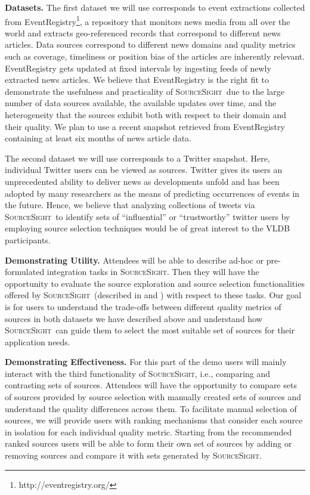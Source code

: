 \documentclass{vldb}
\newcommand\system{\textsc{SourceSight}}
\begin{document}
\vspace{2pt}\noindent\textbf{Datasets.} The first dataset we will use corresponds to event extractions collected from EventRegistry\footnote{http://eventregistry.org/}, a repository that monitors news media from all over the world and extracts geo-referenced records that correspond to different news articles. Data sources correspond to different news domains and quality metrics such as coverage, timeliness or position bias of the articles are inherently relevant. EventRegistry gets updated at fixed intervals  by ingesting feeds of newly extracted news articles. We believe that EventRegistry is the right fit to demonstrate the usefulness and practicality of \system~due to the large number of data sources available, the available updates over time, and the heterogeneity that the sources exhibit both with respect to their domain and their quality. We plan to use a recent snapshot retrieved from EventRegistry containing at least six months of news article data. 

The second dataset we will use corresponds to a Twitter snapshot. Here, individual Twitter users can be viewed as sources. Twitter gives its users an unprecedented ability to deliver news as developments unfold and has been adopted by many researchers as the means of predicting occurrences of events in the future. Hence, we believe that analyzing collections of tweets via \system~to identify sets of ``influential'' or ``trustworthy'' twitter users by employing source selection techniques would be of great interest to the VLDB participants.

\vspace{2pt}\noindent\textbf{Demonstrating Utility.} Attendees will be able to describe ad-hoc or pre-formulated integration tasks in \system. Then they will have the opportunity to evaluate the source exploration and source selection functionalities offered by \system~(described in  and ) with respect to these tasks. Our goal is for users to understand the trade-offs between different quality metrics of sources in both datasets we have described above and understand how \system~can guide them to select the most suitable set of sources for their application needs.

\vspace{2pt}\noindent\textbf{Demonstrating Effectiveness.} For this part of the demo users will mainly interact with the third functionality of \system, i.e., comparing and contrasting sets of sources. Attendees will have the opportunity to compare sets of sources provided by source selection with manually created sets of sources and understand the quality differences across them. To facilitate manual selection of sources, we will provide users with ranking mechanisms that consider each source in isolation for each individual quality metric. Starting from the recommended ranked sources users will be able to form their own set of sources by adding or removing sources and compare it with sets generated by \system. 
\end{document}
